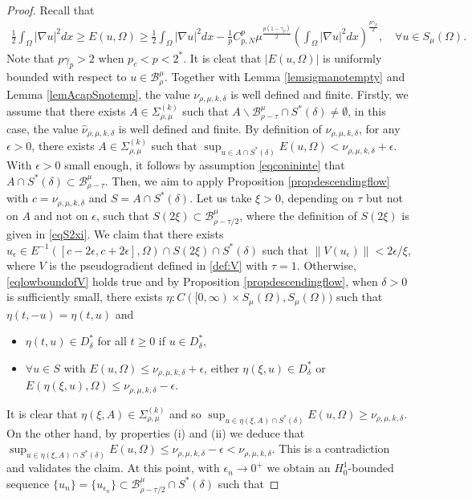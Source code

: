 \documentclass[10pt,a4paper]{article}
\theoremstyle{definition} \theoremstyle{remark}
\numberwithin{equation}{section}
\newcommand{\B}{\mathcal{B}}
\newcommand{\ga}{\gamma}
\newcommand{\ep}{\epsilon}
\begin{document}
\begin{proof}
	Recall that
	\begin{align*}
		\frac12 \int_\Omega |\nabla u|^2dx \ge E(u,\Omega) \geq \frac12 \int_\Omega |\nabla u|^2dx - \frac1p C_{p,N}^p \mu^{\frac{p(1-\ga_p)}{2}}\left( \int_\Omega |\nabla u|^2dx\right) ^{\frac{p\ga_p}{2}}, \quad \forall u \in S_\mu(\Omega).
	\end{align*}
    Note that $p\ga_p > 2$ when $p_c < p < 2^*$. It is cleat that $|E(u,\Omega)|$ is uniformly bounded with respect to $u \in \B_\rho^\mu$. Together with Lemma \ref{lemsigmanotempty} and Lemma \ref{lemAcapSnotemp}, the value $\nu_{\rho,\mu,k,\delta}$ is well defined and finite. Firstly, we assume that there exists $A \in \Sigma_{\rho,\mu}^{(k)}$ such that $A \backslash \B_{\rho -\tau}^\mu \cap S^*(\delta) \neq \emptyset$, in this case, the value $\hat \nu_{\rho,\mu,k,\delta}$ is well defined and finite. By definition of $\nu_{\rho,\mu,k,\delta}$, for any $\ep > 0$, there exists $A \in \Sigma_{\rho,\mu}^{(k)}$ such that $\sup_{u \in A \cap S^*(\delta)}E(u,\Omega) < \nu_{\rho,\mu,k,\delta} + \ep$. With $\ep > 0$ small enough, it follows by assumption \eqref{eqconininte} that $A \cap S^*(\delta) \subset \B_{\rho-\tau}^\mu$. Then, we aim to apply Proposition \ref{propdescendingflow} with $c  = \nu_{\rho,\mu,k,\delta}$ and $S = A \cap S^*(\delta)$. Let us take $\xi > 0$, depending on $\tau$ but not on $A$ and not on $\ep$, such that $S(2\xi) \subset \B_{\rho-\tau/2}^\mu$, where the definition of $S(2\xi)$ is given in \eqref{eqS2xi}. We claim that there exists $u_\ep \in E^{-1}([c-2\epsilon,c+2\epsilon],\Omega) \cap S(2\xi) \cap S^*(\delta)$ such that $\|V(u_\ep)\| < 2\epsilon /\xi$, where $V$ is the pseudogradient defined in \eqref{def:V} with $\tau =1$. Otherwise, \eqref{eqlowboundofV} holds true and by Proposition \ref{propdescendingflow}, when $\delta > 0$ is sufficiently small, there exists $\eta: C([0,\infty) \times S_\mu(\Omega), S_\mu(\Omega))$ such that $\eta(t,-u) = \eta(t,u)$ and
    \begin{itemize}
    	\item[(i)] $\eta(t,u) \in D_\delta^*$ for all $t \geq 0$ if $u \in D_\delta^*$,
    	\item[(ii)] $\forall u \in S$ with $E(u,\Omega) \leq \nu_{\rho,\mu,k,\delta} + \epsilon$, either $\eta(\xi,u) \in D_\delta^*$ or $E(\eta(\xi,u),\Omega) \leq \nu_{\rho,\mu,k,\delta} -\epsilon$.
    \end{itemize}
    It is clear that $\eta(\xi,A) \in \Sigma_{\rho,\mu}^{(k)}$ and so $\sup_{u \in \eta(\xi,A) \cap S^*(\delta)}E(u,\Omega) \geq \nu_{\rho,\mu,k,\delta}$. On the other hand, by properties (i) and (ii) we deduce that $\sup_{u \in \eta(\xi,A) \cap S^*(\delta)}E(u,\Omega) \leq \nu_{\rho,\mu,k,\delta} - \ep < \nu_{\rho,\mu,k,\delta}$. This is a contradiction and validates the claim. At this point, with $\ep_n \to 0^+$ we obtain an $H_0^1$-bounded sequence $\{u_n\} = \{u_{\ep_n}\} \subset \B_{\rho-\tau/2}^\mu \cap S^*(\delta)$ such that

\end{proof}
\end{document}
